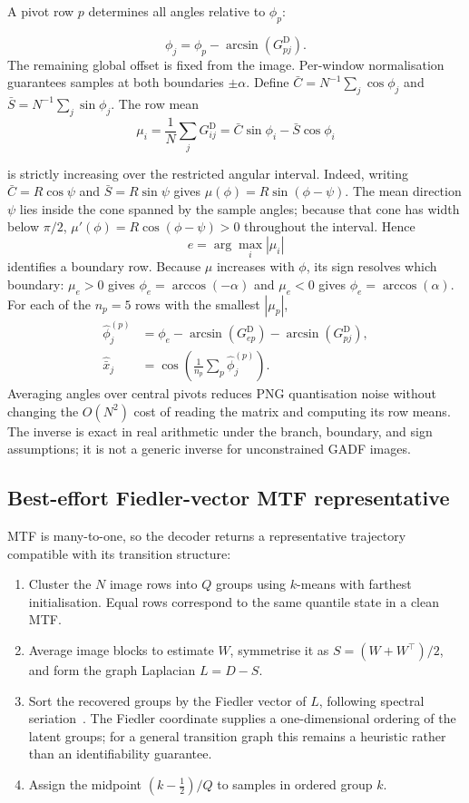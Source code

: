\documentclass[5p]{elsarticle}
\begin{document}
A pivot row \(p\) determines all angles relative to \(\phi_p\):

\[
\phi_j=\phi_p-\arcsin(G^{\mathrm D}_{pj}).
\]
The remaining global offset is fixed from the image. Per-window normalisation guarantees samples at both boundaries \(\pm\alpha\). Define
\(\bar C=N^{-1}\sum_j\cos\phi_j\) and \(\bar S=N^{-1}\sum_j\sin\phi_j\). The row mean
\[
\mu_i=\frac1N\sum_j G^{\mathrm D}_{ij}
=\bar C\sin\phi_i-\bar S\cos\phi_i
\]

is strictly increasing over the restricted angular interval. Indeed, writing
\(\bar C=R\cos\psi\) and \(\bar S=R\sin\psi\) gives
\(\mu(\phi)=R\sin(\phi-\psi)\). The mean direction \(\psi\) lies inside the cone
spanned by the sample angles; because that cone has width below \(\pi/2\),
\(\mu'(\phi)=R\cos(\phi-\psi)>0\) throughout the interval. Hence
\[
e=\arg\max_i|\mu_i|
\]
identifies a boundary row. Because \(\mu\) increases with \(\phi\), its sign resolves which boundary: \(\mu_e>0\) gives \(\phi_e=\arccos(-\alpha)\) and \(\mu_e<0\) gives \(\phi_e=\arccos(\alpha)\). For each of the \(n_p=5\) rows with the smallest \(|\mu_p|\),
\[
\begin{aligned}
\hat\phi^{(p)}_j
&=\phi_e-\arcsin(G^{\mathrm D}_{ep})-\arcsin(G^{\mathrm D}_{pj}),\\
\hat{\bar x}_j
&=\cos\left(\frac1{n_p}\sum_{p}\hat\phi^{(p)}_j\right).
\end{aligned}
\]
Averaging angles over central pivots reduces PNG quantisation noise without changing the \(O(N^2)\) cost of reading the matrix and computing its row means. The inverse is exact in real arithmetic under the branch, boundary, and sign assumptions; it is not a generic inverse for unconstrained GADF images.

\subsection{Best-effort Fiedler-vector MTF representative}\label{sec:mtf_reconstruction_method}

MTF is many-to-one, so the decoder returns a representative trajectory compatible with its transition structure:

\begin{enumerate}
\item Cluster the \(N\) image rows into \(Q\) groups using \(k\)-means with farthest initialisation. Equal rows correspond to the same quantile state in a clean MTF.
\item Average image blocks to estimate \(W\), symmetrise it as \(S=(W+W^\top)/2\), and form the graph Laplacian \(L=D-S\).
\item Sort the recovered groups by the Fiedler vector of \(L\), following spectral seriation~\cite{Atkins1998}. The Fiedler coordinate supplies a one-dimensional ordering of the latent groups; for a general transition graph this remains a heuristic rather than an identifiability guarantee.
\item Assign the midpoint \((k-\tfrac12)/Q\) to samples in ordered group \(k\).
\end{enumerate}
\end{document}

